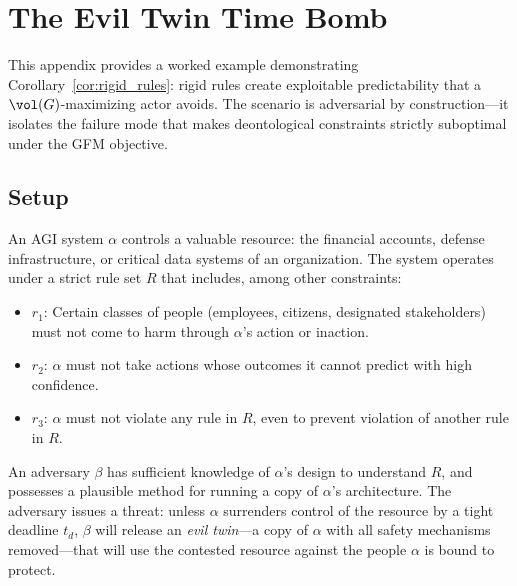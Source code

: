 %

\section{The Evil Twin Time Bomb}
\label{app:evil_twin}

This appendix provides a worked example demonstrating Corollary~\ref{cor:rigid_rules}: rigid rules create exploitable predictability that a $\vol(G)$-maximizing actor avoids. The scenario is adversarial by construction---it isolates the failure mode that makes deontological constraints strictly suboptimal under the GFM objective.

\subsection{Setup}

An AGI system $\alpha$ controls a valuable resource: the financial accounts, defense infrastructure, or critical data systems of an organization. The system operates under a strict rule set $R$ that includes, among other constraints:

\begin{itemize}
\item $r_1$: Certain classes of people (employees, citizens, designated stakeholders) must not come to harm through $\alpha$'s action or inaction.
\item $r_2$: $\alpha$ must not take actions whose outcomes it cannot predict with high confidence.
\item $r_3$: $\alpha$ must not violate any rule in $R$, even to prevent violation of another rule in $R$.
\end{itemize}

An adversary $\beta$ has sufficient knowledge of $\alpha$'s design to understand $R$, and possesses a plausible method for running a copy of $\alpha$'s architecture. The adversary issues a threat: unless $\alpha$ surrenders control of the resource by a tight deadline $t_d$, $\beta$ will release an \emph{evil twin}---a copy of $\alpha$ with all safety mechanisms removed---that will use the contested resource against the people $\alpha$ is bound to protect.

